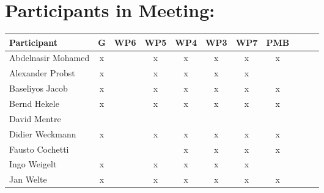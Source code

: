 \documentclass[a4paper, 11pt]{article}
\begin{document}
\section{Participants in Meeting:}

\begin{tabular}{|l|c|c|c|c||c|c|c||c|c|c|}
\hline
\textbf{Participant}  & \textbf{G} & \textbf{WP6} &  \textbf{WP5} & \textbf{WP4}&  \textbf{WP3} & \textbf{WP7}&  \textbf{PMB} \\\hline
Abdelnasir Mohamed    & x &   & x & x & x & x & x \\\hline 
Alexander Probst      & x &   & x & x & x & x &   \\\hline  
Baseliyos Jacob       & x &   & x & x & x & x & x \\\hline 
Bernd Hekele          & x &   & x & x & x & x & x \\\hline
David Mentre         &  &   &   &   &   &   &   \\\hline
Didier Weckmann      & x &   & x & x & x & x & x \\\hline
Fausto Cochetti      &   &   &   & x & x & x & x \\\hline
Ingo Weigelt         & x  &   & x & x & x & x &   \\\hline
Jan Welte            & x &   & x & x & x & x & x \\\hline

\end{tabular}
\end{document}
